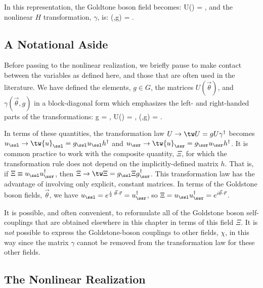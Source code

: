 \documentclass[12pt]{report}
\begin{document}
In this representation, the Goldtone boson field becomes: 
%
\eq
\label{gbfielddefex}
U(\vec\theta) = , \eeq
%
and the nonlinear $H$ transformation, $\gamma$, is: 
%
\eq
\label{gammafielddefex}
\gamma(\vec\theta,g) = . \eeq

\subsection{A Notational Aside}

Before passing to the nonlinear realization, we briefly
pause to make contact between the variables as defined
here, and those that are often used in the literature. We
have defined the elements, $g \in G$, the matrices
$U(\vec\theta)$, and 
$\gamma(\vec\theta,g)$ in a block-diagonal form which
emphasizes the left- and right-handed parts of the
transformations:
%
\eq
\label{newway}
g = , 
\quad U(\vec\theta) = , \quad \gamma(\vec\theta,g) = .
\eeq

In terms of these quantities, the transformation law $U \to
\tw 
U = g U \gamma^\dagger$ becomes $u_\ssl \to \tw{u}_\ssl = 
g_\ssl u_\ssl h^\dagger$ and $u_\ssr \to \tw{u}_\ssr =
g_\ssr 
u_\ssr h^\dagger$. It is common practice to work with the
composite quantity, $\Xi$, for which the transformation
rule does not depend on the implicitly-defined matrix $h$.
That is, if 
$\Xi \equiv u_\ssl u_\ssr^\dagger$, then $\Xi \to \tw\Xi = 
g_\ssl \Xi g_\ssr^\dagger$. This transformation law has the
advantage of involving only explicit, constant matrices. In
terms of the Goldstone boson fields, $\vec\theta$, we have
$u_\ssl = 
e^{{i \over 2}\; \vec\theta \cdot \vec\tau} =
u_\ssr^\dagger$, 
so $\Xi = u_\ssl u_\ssr^\dagger = e^{i \vec\theta \cdot
\vec\tau}$.

It is possible, and often convenient, to reformulate all of
the Goldstone boson self-couplings that are obtained
elsewhere in this chapter in terms of this field $\Xi$. It
is {\em not} possible to express the Goldstone-boson
couplings to other fields, $\chi$, in this way since the
matrix $\gamma$ cannot be removed from the transformation
law for these other fields.

\subsection{The Nonlinear Realization}
\end{document}
